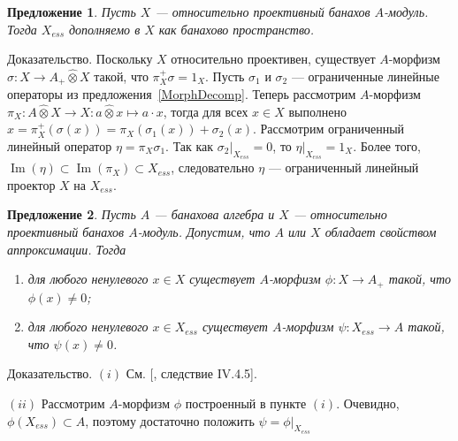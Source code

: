 \documentclass[12pt]{article}
\numberwithin{equation}{subsection}
\theoremstyle{plain}
\newtheorem{proposition}{Предложение}
\newenvironment{proof}{Доказательство.}{}
\newcommand{\projtens}{\mathbin{\widehat{\otimes}}}
\begin{document}
\begin{fulltext}
    \begin{proposition}\label{ProjModEssPartCompl} Пусть $X$ --- относительно
        проективный банахов $A$-модуль. Тогда $X_{ess}$ дополняемо в $X$ как
        банахово пространство.
    \end{proposition}
    \begin{proof} Поскольку $X$ относительно проективен, существует $A$-морфизм
        $\sigma:X\to A_+\projtens X$ такой, что $\pi_X^+\sigma=1_X$. Пусть
        $\sigma_1$ и $\sigma_2$ --- ограниченные линейные операторы из
        предложения~\ref{MorphDecomp}. Теперь рассмотрим $A$-морфизм
        $\pi_X:A\projtens X\to X:a\projtens x\mapsto a\cdot x$, тогда для всех
        $x\in X$ выполнено $x=\pi_X^+(\sigma(x))=\pi_X(\sigma_1(x)) +
            \sigma_2(x)$. Рассмотрим ограниченный линейный оператор $\eta =
            \pi_X\sigma_1$. Так как $\sigma_2|_{X_{ess}}=0$, то
        $\eta|_{X_{ess}}=1_X$. Более того,
        $\operatorname{Im}(\eta)\subset\operatorname{Im}(\pi_X)\subset X_{ess}$,
        следовательно $\eta$ --- ограниченный линейный проектор $X$ на
        $X_{ess}$.
    \end{proof}


    \begin{proposition}\label{RelProjNecesCond} Пусть $A$ --- банахова алгебра и
        $X$ --- относительно проективный банахов $A$-модуль. Допустим, что $A$
        или $X$ обладает свойством аппроксимации. Тогда
        \begin{enumerate}[label = (\roman*)]
            \item для любого ненулевого $x\in X$ существует $A$-морфизм
                  $\phi:X\to A_+$ такой, что $\phi(x)\neq 0$;

            \item для любого ненулевого $x\in X_{ess}$ существует $A$-морфизм
                  $\psi:X_{ess}\to A$ такой, что $\psi(x)\neq 0$.
        \end{enumerate}

    \end{proposition}
    \begin{proof} $(i)$ См. [\cite{HelHomolBanTopAlg}, следствие IV.4.5].

        $(ii)$ Рассмотрим $A$-морфизм $\phi$ построенный в пункте $(i)$.
        Очевидно, $\phi(X_{ess})\subset A$, поэтому достаточно положить 
        $\psi=\phi|_{X_{ess}}$
    \end{proof}



\end{fulltext}
\end{document}
